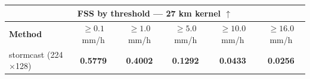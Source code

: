 \documentclass[border=10pt]{standalone}
\begin{document}
\begin{tabular}{lccccc}
\toprule
\multicolumn{6}{c}{\textbf{FSS by threshold — 27 km kernel} $\uparrow$} \\
\midrule
\textbf{Method} & $\geq 0.1$ mm/h & $\geq 1.0$ mm/h & $\geq 5.0$ mm/h & $\geq 10.0$ mm/h & $\geq 16.0$ mm/h \\
\midrule
stormcast (224$\times$128) & \textbf{0.5779} & \textbf{0.4002} & \textbf{0.1292} & \textbf{0.0433} & \textbf{0.0256} \\
\bottomrule
\end{tabular}
\end{document}
